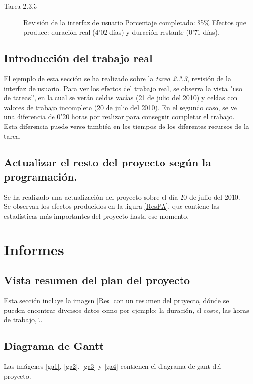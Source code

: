 \documentclass[11pt,a4paper,spanish,twoside]{book}
\begin{document}
\begin{description}
\item[Tarea 2.3.3] Revisión de la interfaz de usuario
  Porcentaje completado: 85\%
  Efectos que produce: duración real (4'02 días) y duración restante 
(0'71 días).
\end{description}

\section{Introducción del trabajo real}
El ejemplo de esta sección se ha realizado sobre la \emph{tarea 2.3.3}, 
revisión de la interfaz de usuario. Para ver los efectos del trabajo real, se 
observa la vista "uso de tareas'', en la cual se verán celdas vacías (21 de 
julio del 2010) y celdas con valores de trabajo incompleto (20 de julio del 
2010). En el segundo caso, se ve una diferencia de 0'20 horas por realizar para
conseguir completar el trabajo. Esta diferencia puede verse también en los 
tiempos de los diferentes recursos de la tarea.

\section{Actualizar el resto del proyecto según la programación.}
Se ha realizado una actualización del proyecto sobre el día 20 de julio del 
2010. Se observan los efectos producidos en la figura \ref{ResPA}, que contiene
las estadísticas más importantes del proyecto hasta ese momento.


\chapter{Informes}
\section{Vista resumen del plan del proyecto}
Esta sección incluye la imagen \ref{Res} con un resumen del proyecto, dónde
se pueden encontrar diversos datos como por ejemplo: la duración, el coste,
las horas de trabajo, \...


\section{Diagrama de Gantt}
Las imágenes \ref{ga1}, \ref{ga2}, \ref{ga3} y \ref{ga4} contienen el
diagrama de gant del proyecto.
\end{document}
